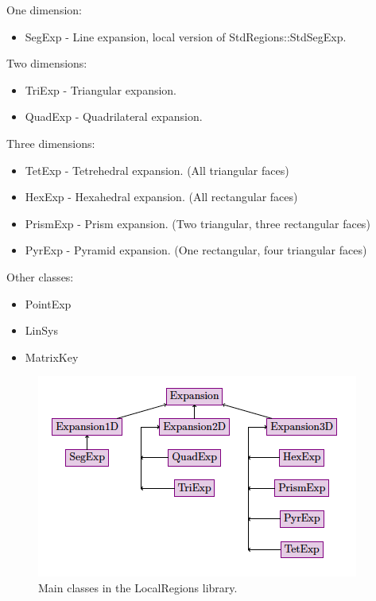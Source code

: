 One dimension:
\begin{itemize}
\item SegExp - Line expansion, local version of StdRegions::StdSegExp.
\end{itemize}

Two dimensions:
\begin{itemize}
\item TriExp - Triangular expansion.
\item QuadExp - Quadrilateral expansion.
\end{itemize}

Three dimensions:
\begin{itemize}
\item TetExp - Tetrehedral expansion. (All triangular faces) 
\item HexExp - Hexahedral expansion. (All rectangular faces)
\item PrismExp - Prism expansion. (Two triangular, three rectangular faces)
\item PyrExp - Pyramid expansion. (One rectangular, four triangular faces)
\end{itemize}

Other classes:
\begin{itemize}
\item PointExp
\item LinSys
\item MatrixKey
\end{itemize}

\begin{figure}
\centering
\includegraphics[width=\textwidth]{img/LocalRegions.png}
\caption{Main classes in the LocalRegions library.}
\label{f:library:localregions}
\end{figure}

